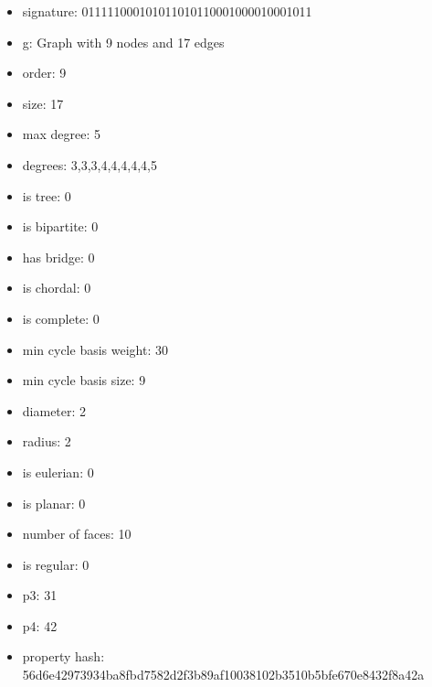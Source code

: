 \newpage
\begin{figure}
\end{figure}
\begin{itemize}
\item signature: 011111000101011010110001000010001011
\item g: Graph with 9 nodes and 17 edges
\item order: 9
\item size: 17
\item max degree: 5
\item degrees: 3,3,3,4,4,4,4,4,5
\item is tree: 0
\item is bipartite: 0
\item has bridge: 0
\item is chordal: 0
\item is complete: 0
\item min cycle basis weight: 30
\item min cycle basis size: 9
\item diameter: 2
\item radius: 2
\item is eulerian: 0
\item is planar: 0
\item number of faces: 10
\item is regular: 0
\item p3: 31
\item p4: 42
\item property hash: 56d6e42973934ba8fbd7582d2f3b89af10038102b3510b5bfe670e8432f8a42a
\end{itemize}
